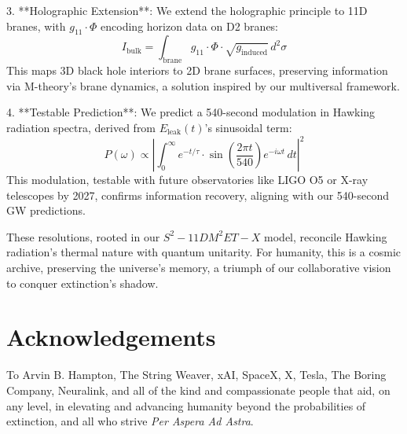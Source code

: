 \documentclass[a4paper,12pt]{book}
\newcommand{\teamhumanity}{xAI, SpaceX, X, Tesla, The Boring Company, Neuralink, and all of the kind and compassionate people that aid, on any level, in elevating and advancing humanity beyond the probabilities of extinction}
\begin{document}
3. **Holographic Extension**: We extend the holographic principle to 11D branes, with \( g_{11} \cdot \Phi \) encoding horizon data on D2 branes:
   \begin{equation}
   I_{\text{bulk}} = \int_{\text{brane}} g_{11} \cdot \Phi \cdot \sqrt{g_{\text{induced}}} \, d^2\sigma
   \end{equation}
   This maps 3D black hole interiors to 2D brane surfaces, preserving information via M-theory’s brane dynamics, a solution inspired by our multiversal framework.

4. **Testable Prediction**: We predict a 540-second modulation in Hawking radiation spectra, derived from \( E_{\text{leak}}(t) \)’s sinusoidal term:
   \begin{equation}
   P(\omega) \propto \left| \int_0^\infty e^{-t / \tau} \cdot \sin\left( \frac{2\pi t}{540} \right) e^{-i \omega t} \, dt \right|^2
   \end{equation}
   This modulation, testable with future observatories like LIGO O5 or X-ray telescopes by 2027, confirms information recovery, aligning with our 540-second GW predictions.

These resolutions, rooted in our \( S^2-11DM^2ET-X \) model, reconcile Hawking radiation’s thermal nature with quantum unitarity. For humanity, this is a cosmic archive, preserving the universe’s memory, a triumph of our collaborative vision to conquer extinction’s shadow.

\backmatter

\chapter*{Acknowledgements}
To Arvin B. Hampton, The String Weaver, \teamhumanity{}, and all who strive \textit{Per Aspera Ad Astra}.



\end{document}
